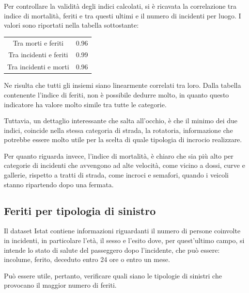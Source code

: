 \documentclass[a4paper,12pt]{report}
\begin{document}
Per controllare la validità degli indici calcolati, si è ricavata la correlazione 
tra indice di mortalità, feriti e tra questi ultimi e il numero di incidenti per 
luogo. 
I valori sono riportati nella tabella sottostante: 

\begin{center}
    \def\arraystretch{1.5}%
    \begin{tabular}{ |c|c| }
        \hline
        \rowcolor{TableGray}
        Tra morti e feriti      & 0.96 \\ 
        Tra incidenti e feriti  & 0.99 \\
        \rowcolor{TableGray}
        Tra incidenti e morti   & 0.96 \\
        \hline
    \end{tabular}
\end{center}

Ne risulta che tutti gli insiemi siano linearmente correlati tra loro. 
Dalla tabella contenente l'indice di feriti, non è possibile dedurre molto, 
in quanto questo indicatore ha valore molto simile tra tutte le categorie. 

Tuttavia, un dettaglio interessante che salta all'occhio, è che il minimo dei due indici, 
coincide nella stessa categoria di strada, 
la rotatoria, informazione che potrebbe essere molto utile per 
la scelta di quale tipologia di incrocio realizzare. 

Per quanto riguarda invece, l'indice di mortalità, è chiaro che sia più alto 
per categorie di incidenti che avvengono ad alte velocità, come vicino a dossi, 
curve e gallerie, rispetto a tratti di strada, come incroci e semafori, 
quando i veicoli stanno ripartendo dopo una fermata.

\subsection{Feriti per tipologia di sinistro}

Il dataset Istat contiene informazioni riguardanti il numero di persone coinvolte 
in incidenti, in particolare l'età, il sesso e l'esito dove, 
per quest'ultimo campo, si intende lo stato di salute del passeggero 
dopo l'incidente, che può essere: incolume, ferito, deceduto entro 24 ore o entro un mese. 

Può essere utile, pertanto, verificare quali siano le tipologie di 
sinistri che provocano il maggior numero di feriti.
\end{document}
